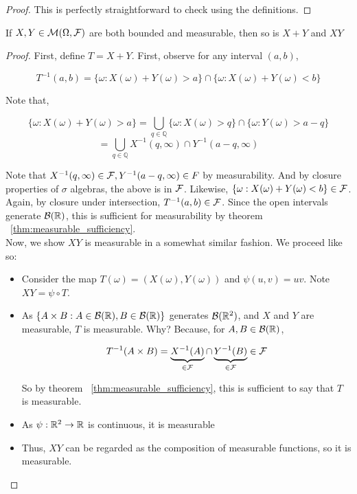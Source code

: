 \begin{proof}
    This is perfectly straightforward to check using the definitions.
\end{proof}

\begin{theorem}
    If $X, Y  \in \mathcal M(\Omega, \mathcal F)$ are both bounded and measurable, then 
    so is $X + Y$ and $XY$
\end{theorem}

\begin{proof}
    First, define $T = X + Y$. First, observe for any interval $(a,b)$,

    \[ T^{-1}(a,b) = \{\omega : X(\omega) + Y(\omega) > a\} \cap \{\omega : X(\omega) + Y(\omega) < b\}  \]

    Note that, 

    \[ \{\omega : X(\omega) + Y(\omega) > a\} = \bigcup_{q \in \mathbb Q}\{\omega : X(\omega) > q\} \cap \{\omega : Y(\omega) > a - q\}\]
    \[ = \bigcup_{q \in \mathbb Q} X^{-1}(q, \infty) \cap Y^{-1}(a-q,\infty)\]

    Note that $X^{-1}(q, \infty) \in \mathcal F, Y^{-1}(a-q,\infty) \in F$ by measurability. 
    And by closure properties of $\sigma$ algebras, the above is in $\mathcal F$. Likewise, 
    $  \{\omega : X(\omega) + Y(\omega) < b\} \in \mathcal F$. Again, by closure under intersection, 
    $T^{-1}(a,b) \in \mathcal F$. Since the open intervals generate $\mathcal B(\mathbb R)$, this is sufficient for measurability 
    by theorem ~\ref{thm:measurable_sufficiency}.\\ 

    Now, we show $XY$ is measurable in a somewhat similar fashion. We proceed like so: 
    \begin{itemize}
        \item Consider the map $T(\omega) = (X(\omega), Y(\omega))$ and 
            $\psi(u,v) = uv$. Note $XY = \psi \circ T$.
        \item As $\{ A \times B : A \in \mathcal B(\mathbb R), B \in \mathcal B(\mathbb R) \}$ generates 
                $\mathcal B(\mathbb R^2)$, and $X$ and $Y$ are measurable, $T$ is measurable. 
                Why? Because, for $A,B \in \mathcal B(\mathbb R)$,

                \[ T^{-1}(A \times B) = \underbrace{X^{-1}(A)}_{\in \mathcal F} \cap \underbrace{Y^{-1}(B)}_{\in \mathcal F} \in \mathcal F  \]

                So by theorem ~\ref{thm:measurable_sufficiency}, this is sufficient to say that $T$ is measurable.

        \item As $\psi : \mathbb R^2 \to \mathbb R$ is continuous, it is measurable
        \item Thus, $XY$ can be regarded as the composition of measurable functions, so it is measurable.
    \end{itemize}
\end{proof}

